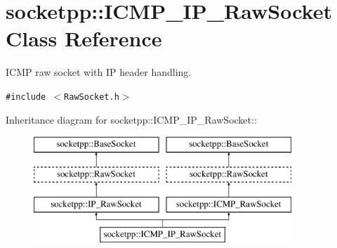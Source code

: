 \hypertarget{classsocketpp_1_1ICMP__IP__RawSocket}{
\section{socketpp::ICMP\_\-IP\_\-RawSocket Class Reference}
\label{classsocketpp_1_1ICMP__IP__RawSocket}
}
ICMP raw socket with IP header handling.  


{\tt \#include $<$RawSocket.h$>$}

Inheritance diagram for socketpp::ICMP\_\-IP\_\-RawSocket::\begin{figure}[H]
\begin{center}
\leavevmode
\includegraphics[height=4cm]{classsocketpp_1_1ICMP__IP__RawSocket}
\end{center}
\end{figure}
